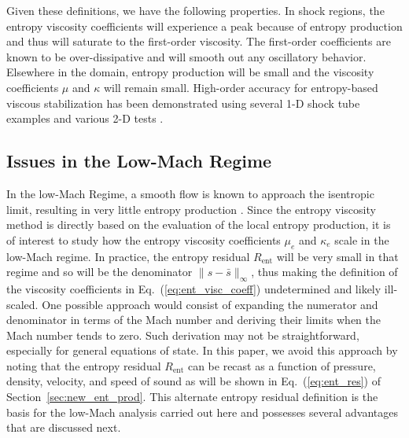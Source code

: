 \documentclass[review,10pt]{elsarticle}
\newcommand{\resi}{R_\text{ent}}
\newcommand{\eqt}[1]{Eq.~(\ref{#1})}                     %
\newcommand{\sct}[1]{Section~\ref{#1}}                   %
\begin{document}
%
Given these definitions, we have the following properties.
In shock regions, the entropy viscosity coefficients will experience a peak because of entropy production and thus 
will saturate to the first-order viscosity. The first-order coefficients are known to be over-dissipative and will 
smooth out any oscillatory behavior. Elsewhere in the domain, entropy production will be small and the viscosity 
coefficients $\mu$ and $\kappa$ will remain small. %
High-order accuracy for entropy-based viscous stabilization has been demonstrated using several 1-D shock tube 
examples and various 2-D tests \cite{jlg1, jlg2, valentin}.

\subsection{Issues in the Low-Mach Regime} 

In the low-Mach Regime, a smooth flow is known to approach the isentropic limit, resulting in very little 
entropy production \cite{alazard}. Since the entropy viscosity method is directly based on the evaluation of the 
local entropy production, it is of interest to study how the entropy viscosity coefficients $\mu_e$ 
and $\kappa_e$ scale in the low-Mach regime. In practice, the entropy residual $\resi$ will be very 
small in that regime and so will be the denominator $\| s - \bar{s} \|_\infty$, thus making the 
definition of the viscosity coefficients in \eqt{eq:ent_visc_coeff} undetermined and likely ill-scaled.  
One possible approach would consist of expanding the numerator and denominator in terms of the Mach number 
and deriving their limits when the Mach number tends to zero. Such derivation may not be straightforward, 
especially for general equations of state. In this paper, we avoid this approach by noting that the entropy 
residual $\resi$ can be recast as a function of pressure, density, velocity, and speed of sound as 
will be shown in \eqt{eq:ent_res} of \sct{sec:new_ent_prod}. This alternate entropy residual definition 
is the basis for the low-Mach analysis carried out here and possesses several advantages that 
are discussed next. %

\end{document}
